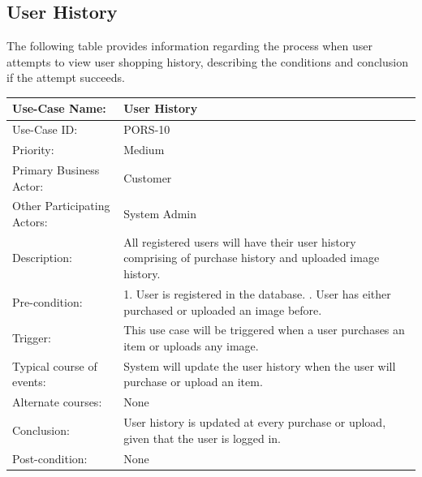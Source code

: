 \subsection{User History}
The following table provides information regarding the process when user attempts to view user shopping history, describing the conditions and conclusion if the attempt succeeds. 
\begin{center}
    \begin{tabular}{ @{}|p{5cm}||p{7cm}|  }
    \hline
    Use-Case Name: & User History \\ \hline
    Use-Case ID: & PORS-10\\ \hline
    Priority: & Medium \\ \hline
    Primary Business Actor: & Customer \\ \hline
    Other Participating Actors: & System Admin \\ \hline
    Description: & All registered users will have their user history comprising of purchase history and uploaded image history. \\ \hline
    Pre-condition: & 1.	User is registered in the database. \newline 2. User has either purchased or uploaded an image before.
 \\ \hline
    Trigger: & This use case will be triggered when a user purchases an item or uploads any image. \\ \hline
    Typical course of events: &  System will update the user history when the user will purchase or upload an item.\\ \hline
    Alternate courses: & None\\ \hline
    Conclusion: & User history is updated at every purchase or upload, given that the user is logged in.\\ \hline
    Post-condition: &  None\\ \hline
    \end{tabular}
\end{center}

